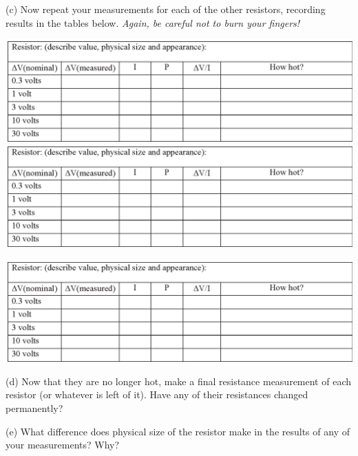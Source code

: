 (c) Now repeat your measurements for each of the other resistors, recording results in the tables below.  \textit{Again, be careful not to burn your fingers!}
\begin{center}
\includegraphics[width=1.0\textwidth]{electric_power/iv_table.eps}
\includegraphics[width=1.0\textwidth]{electric_power/iv_table.eps}

\vspace{0.5in}
\includegraphics[width=1.0\textwidth]{electric_power/iv_table.eps}
\end{center}

(d) Now that they are no longer hot, make a final resistance measurement of each resistor (or whatever is left of it).  Have any of their resistances changed permanently?
\vspace{1.5in}

(e) What difference does physical size of the resistor make in the results of any of your measurements?  Why?
\vspace{1.5in}






